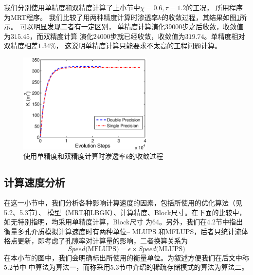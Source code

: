 我们分别使用单精度和双精度计算了上小节中$\chi = 0.6, \tau=1.2$的工况，
所用程序为MRT程序。
我们比较了用两种精度计算时渗透率$k$的收敛过程，其结果如图\ref{fig:dp_sp}所示。
可以明显发现二者有一定区别，
单精度计算演化39000步之后收敛，收敛值为$315.45$，而双精度计算
演化24000步就已经收敛，收敛值为$319.74$。单精度相对双精度相差$1.34\%$，
这说明单精度计算只能要求不太高的工程问题计算。

\begin{figure}[htb]
  \centering
  \includegraphics[width=0.6\textwidth]{img/dp_sp}
  \caption{使用单精度和双精度计算时渗透率$k$的收敛过程}
  \label{fig:dp_sp}
\end{figure}


\subsection{计算速度分析}
在这一小节中，我们分析各种影响计算速度的因素，包括所使用的优化算法（见5.2、5.3节）、
模型（MRT和LBGK）、计算精度、Block尺寸。在下面的比较中，如无特别指明，均采用单精度计算，Block尺寸
为64。另外，我们在4.2节中指出衡量多孔介质模拟计算速度时有两种单位\--- MLUPS
和MFLUPS，后者只统计流体格点更新，即考虑了孔隙率对计算量的影响，二者换算关系为
\begin{equation}
  Speed\text{(MFLUPS)} = \epsilon \times Speed \text{(MLUPS)}
  \label{speed_relation}
\end{equation}
在本小节的图中，我们会明确标出所使用的衡量单位。为叙述方便我们在后文中称5.2节中
中算法为算法一，而称采用5.3节中介绍的稀疏存储模式的算法为算法二。

